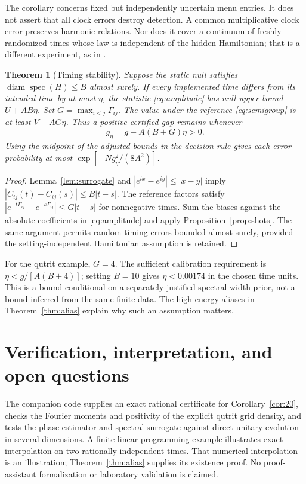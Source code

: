 \documentclass[11pt,a4paper]{article}
\newtheorem{theorem}{Theorem}[section]
\theoremstyle{remark}\newtheorem{remark}[theorem]{Remark}
\newcommand{\diam}{\operatorname{diam}}
\begin{document}
The corollary concerns fixed but independently uncertain menu entries.
It does not assert that all clock errors destroy detection. A common
multiplicative clock error preserves harmonic relations. Nor does it
cover a continuum of freshly randomized times whose law is independent
of the hidden Hamiltonian; that is a different experiment, as in
\cite{parent,qutrit}.

\begin{theorem}[Timing stability]\label{thm:clock}
Suppose the static null satisfies
$\diam\operatorname{spec}(H)\leq B$ almost surely. If every implemented
time differs from its intended time by at most $\eta$, the statistic
\eqref{eq:amplitude} has null upper bound $U+AB\eta$.
Set $G=\max_{i<j}\Gamma_{ij}$. The value under the reference
\eqref{eq:semigroup} is at least $V-AG\eta$.
Thus a positive certified gap remains whenever
\begin{equation}\label{eq:clockgap}
 g_\eta=g-A(B+G)\eta>0.
\end{equation}
Using the midpoint of the adjusted bounds in the decision rule gives
each error probability at most $\exp[-Ng_\eta^2/(8A^2)]$.
\end{theorem}
\begin{proof}
Lemma~\ref{lem:surrogate} and
$|e^{ix}-e^{iy}|\leq|x-y|$ imply
$|C_{ij}(t)-C_{ij}(s)|\leq B|t-s|$.
The reference factors satisfy
$|e^{-t\Gamma_{ij}}-e^{-s\Gamma_{ij}}|\leq G|t-s|$ for nonnegative
times. Sum the biases against the absolute coefficients in
\eqref{eq:amplitude} and apply Proposition~\ref{prop:shots}.
The same argument permits random timing errors bounded almost surely,
provided the setting-independent Hamiltonian assumption is retained.
\end{proof}

For the qutrit example, $G=4$. The sufficient calibration requirement is
$\eta<g/[A(B+4)]$; setting $B=10$ gives
$\eta<0.00174$ in the chosen time units. This is a bound conditional on
a separately justified spectral-width prior, not a bound inferred from
the same finite data. The high-energy aliases in
Theorem~\ref{thm:alias} explain why such an assumption matters.

\section{Verification, interpretation, and open questions}
The companion code supplies an exact rational certificate for
Corollary~\ref{cor:20}, checks the Fourier moments and positivity of the
explicit qutrit grid density, and tests the phase estimator and spectral
surrogate against direct unitary evolution in several dimensions. A
finite linear-programming example illustrates exact interpolation on
two rationally independent times. That numerical interpolation is an
illustration; Theorem~\ref{thm:alias} supplies its existence proof.
No proof-assistant formalization or laboratory validation is claimed.
\end{document}
